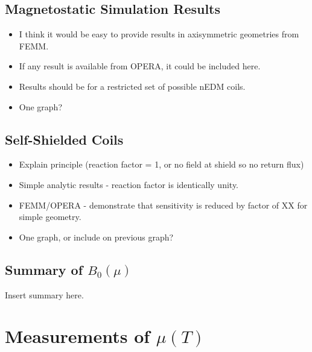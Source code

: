 \documentclass[review]{elsarticle}
\begin{document}
\subsection{Magnetostatic Simulation Results}

\begin{itemize}
\item I think it would be easy to provide results in axisymmetric
  geometries from FEMM.
\item If any result is available from OPERA, it could be included here.
\item Results should be for a restricted set of possible nEDM coils.
\item One graph?  %
\end{itemize}

\subsection{Self-Shielded Coils}

\begin{itemize}
\item Explain principle (reaction factor = 1, or no field at shield so
  no return flux)
\item Simple analytic results - reaction factor is identically unity.
\item FEMM/OPERA - demonstrate that sensitivity is reduced by factor
  of XX for simple geometry.
\item One graph, or include on previous graph?
\end{itemize}

\subsection{Summary of $B_0(\mu)$}

Insert summary here.

\section{Measurements of $\mu(T)$}
\end{document}
